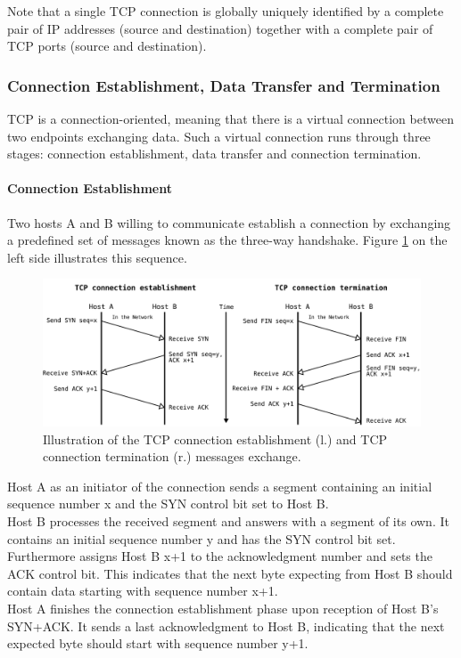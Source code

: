 Note that a single TCP connection is globally uniquely identified by a complete pair of IP addresses (source and destination) together with a complete pair of TCP ports (source and destination).

\subsubsection{Connection Establishment, Data Transfer and Termination}

TCP is a connection-oriented, meaning that there is a virtual connection between two endpoints exchanging data. Such a virtual connection runs through three stages: connection establishment, data transfer and connection termination.

\paragraph{Connection Establishment}

Two hosts A and B willing to communicate establish a connection by exchanging a predefined set of messages known as the three-way handshake. Figure \ref{fig:TCPConnectionEstablishmentAndTermination} on the left side illustrates this sequence. 

\begin{figure}[H]
	\begin{center} 
		\def\svgwidth{1\textwidth}
		\includegraphics[scale=0.24]{../illustrations/importantConcepts/TCPHandshake.pdf} 
		\caption[Caption for the list of figures.]{Illustration of the TCP connection establishment (l.) and TCP connection termination (r.) messages exchange.}
		\label{fig:TCPConnectionEstablishmentAndTermination}
	\end{center}
\end{figure}

Host A as an initiator of the connection sends a segment containing an initial sequence number x and the SYN control bit set to Host B. \smallskip\\Host B processes the received segment and answers with a segment of its own. It contains an initial sequence number y and has the SYN control bit set. Furthermore assigns Host B x+1 to the acknowledgment number and sets the ACK control bit. This indicates that the next byte expecting from Host B should contain data starting with sequence number x+1. \smallskip\\ Host A finishes the connection establishment phase upon reception of Host B's SYN+ACK. It sends a last acknowledgment to Host B, indicating that the next expected byte should start with sequence number y+1.

